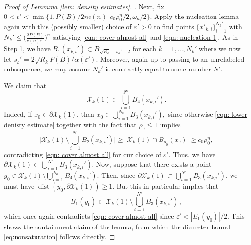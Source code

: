 \documentclass[10pt,reqno]{amsart}
\numberwithin{equation}{section}
\theoremstyle{definition}
\DeclareMathOperator{\dist}{dist}
\newcommand{\eps}{\epsilon}
\renewcommand{\eps}{\varepsilon}
\newcommand{\e}{\varepsilon}
\newcommand{\X}{\mathcal{X}}
\begin{document}
{\begin{proof}[Proof of Lemmma \ref{lem: density estimates}]
\medskip

. 
Next, fix $0< \e' < \min\{ 1, P(B)/2nc(n), c_0 \rho_0^n/2, {\omega_n}/2\}$.
Apply the nucleation lemma \cite[Lemma 29.10]{Mag12} again with this (possibly smaller) choice of $\e'>0$
to find points $\{x'_{k,i}\}_{i=1}^{N_k'}$ with $N_k' \leq \big(\tfrac{2P(B)}{c(n)\eps'}\big)^n$ satisfying \eqref{eqn: cover almost all} and \eqref{eqn: nucleation 1}.
As in Step 1, we have $B_1(x_{k,i}')\subset B_{{\sqrt{R_k}}+s_k'+2}$ for each $k=1,\dots, N_k'$ where we now let $s_k'= 2\sqrt{R_{k}}P(B)/\alpha{(\e')}$. Moreover, again up to passing to an unrelabeled subsequence, we may assume $N_k'$ is constantly equal to some number $N'.$ 

We claim that
\begin{equation}\label{eqn: contained in balls of radius 3}
\X_k(1) \subset \bigcup_{i=1}^{N'} {B_4}(x_{k,i}').
\end{equation}
Indeed, if $x_0 \in \partial \X_k(1)$, then $x_0 \in \bigcup_{i=1}^{N_0} B_{3}(x_{k,i}'),$ since otherwise \eqref{eqn: lower denisty estimate} together with the fact that $\rho_0\leq 1$ implies
\[
 \Big|\X_k(1)\setminus \bigcup_{i=1}^{N'} B_2(x_{k,i}')\Big| \geq |\X_k(1) \cap B_{\rho_0}(x_0) | \geq c_0 \rho_0^n,
\]
contradicting \eqref{eqn: cover almost all} {for our choice of $\eps'$}. 
%
Thus, we have $\partial \X_k(1) \subset \bigcup_{i=1}^{N'} B_3(x_{k,i}')$.
%
%
{Now, suppose that there exists a point $y_0 \in \X_k(1) \setminus \bigcup_{i=1}^{N_0} B_{4}(x_{k,i}')$. Then, since  $\partial \X_k(1) \subset \bigcup_{i=1}^{N'} B_3(x_{k,i}')$, we must have $\dist(y_0, \partial \X_k(1)) \geq 1$. But this in particular implies that
\[
    B_1(y_0) \subset \X_k(1) \setminus \bigcup_{i=1}^{N'} B_3(x_{k,i}')\,,
\]
which once again contradicts \eqref{eqn: cover almost all}} { since $\e'< |B_1(y_0)|/2$.} 
%
This shows the containment claim of the lemma,  from which the diameter bound \eqref{eq:nonsaturation} follows directly.
\end{proof}

}
\end{document}

